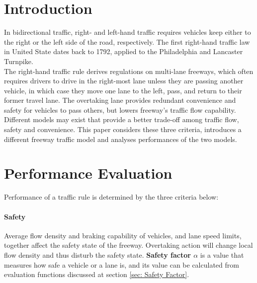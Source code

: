 

\section{Introduction}
\label{sec: Introduction}

In bidirectional traffic, right- and left-hand traffic requires 
vehicles keep either to the right or the left side of the road, 
respectively.\cite{Draper_Geoff_1993} The first right-hand 
traffic law in United State dates back to 1792, applied to the 
Philadelphia and Lancaster Turnpike.
\cite{Weingroff_Richard_2014}\\

The right-hand traffic rule derives regulations on multi-lane 
freeways, which often requires drivers to drive in the 
right-most lane unless they are passing another vehicle, in 
which case they move one lane to the left, pass, and return 
to their former travel lane. The overtaking lane provides 
redundant convenience and safety for vehicles to pass others, 
but lowers freeway's traffic flow capability.\\

Different models may exist that provide a better trade-off 
among traffic flow, safety and convenience. This paper 
considers these three criteria, introduces a different 
freeway traffic model and analyses performances of the two 
models.




\section{Performance Evaluation}
\label{sec: Performance Evaluation}

Performance of a traffic rule is determined by the three 
criteria below: 

\paragraph{Safety} Average flow density and braking capability 
of vehicles, and lane speed limits, together affect the safety 
state of the freeway. Overtaking action will change local flow 
density and thus disturb the safety state. \textbf{Safety 
factor $\alpha$} is a value that measures how safe a vehicle 
or a lane is, and its value can be calculated from evaluation 
functions discussed at section \ref{sec: Safety Factor}.

